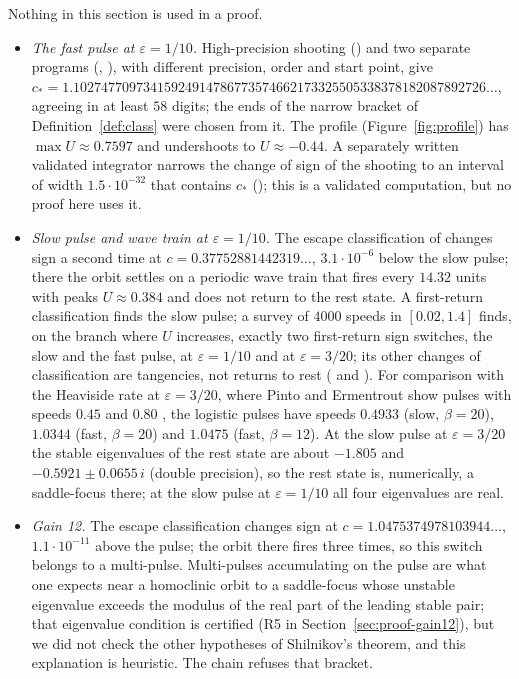 \documentclass[11pt]{article}
\theoremstyle{definition}
\newcommand{\eps}{\varepsilon}
\begin{document}
Nothing in this section is used in a proof.
\begin{itemize}
\item \emph{The fast pulse at $\eps = 1/10$.} High-precision shooting () and two separate programs (, ), with different precision, order and start point, give $c_* = 1.1027477097\allowbreak 3415924914\allowbreak 7867735746\allowbreak 6217332550\allowbreak 5338378182\allowbreak 087892726\ldots$, agreeing in at least $58$ digits; the ends of the narrow bracket of Definition~\ref{def:class} were chosen from it. The profile (Figure~\ref{fig:profile}) has $\max U \approx 0.7597$ and undershoots to $U \approx -0.44$. A separately written validated integrator narrows the change of sign of the shooting to an interval of width $1.5\cdot 10^{-32}$ that contains $c_*$ (); this is a validated computation, but no proof here uses it.
\item \emph{Slow pulse and wave train at $\eps = 1/10$.} The escape classification of  changes sign a second time at $c = 0.37752881442319\ldots$, $3.1\cdot 10^{-6}$ below the slow pulse; there the orbit settles on a periodic wave train that fires every $14.32$ units with peaks $U \approx 0.384$ and does not return to the rest state. A first-return classification finds the slow pulse; a survey of $4000$ speeds in $[0.02, 1.4]$ finds, on the branch where $U$ increases, exactly two first-return sign switches, the slow and the fast pulse, at $\eps = 1/10$ and at $\eps = 3/20$; its other changes of classification are tangencies, not returns to rest ( and ). For comparison with the Heaviside rate at $\eps = 3/20$, where Pinto and Ermentrout show pulses with speeds $0.45$ and $0.80$ \cite[Fig.~8]{pe2001}, the logistic pulses have speeds $0.4933$ (slow, $\beta = 20$), $1.0344$ (fast, $\beta = 20$) and $1.0475$ (fast, $\beta = 12$). At the slow pulse at $\eps = 3/20$ the stable eigenvalues of the rest state are about $-1.805$ and $-0.5921 \pm 0.0655\,i$ (double precision), so the rest state is, numerically, a saddle-focus there; at the slow pulse at $\eps = 1/10$ all four eigenvalues are real.
\item \emph{Gain 12.} The escape classification changes sign at $c = 1.0475374978103944\ldots$, $1.1\cdot 10^{-11}$ above the pulse; the orbit there fires three times, so this switch belongs to a multi-pulse. Multi-pulses accumulating on the pulse are what one expects near a homoclinic orbit to a saddle-focus whose unstable eigenvalue exceeds the modulus of the real part of the leading stable pair; that eigenvalue condition is certified (R5 in Section~\ref{sec:proof-gain12}), but we did not check the other hypotheses of Shilnikov's theorem, and this explanation is heuristic. The chain refuses that bracket.

\end{itemize}
\end{document}
